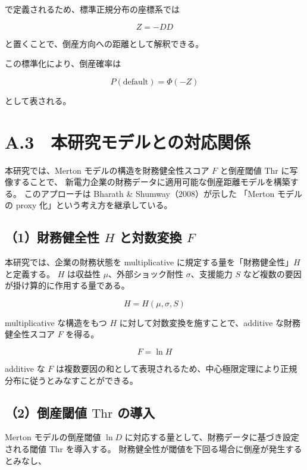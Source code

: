 で定義されるため、標準正規分布の座標系では



\[
Z = -DD
\]



と置くことで、倒産方向への距離として解釈できる。

この標準化により、倒産確率は



\[
P(\text{default}) = \Phi(-Z)
\]



として表される。

\section*{A.3　本研究モデルとの対応関係}

本研究では、Merton モデルの構造を財務健全性スコア $F$ と倒産閾値 $\mathrm{Thr}$ に写像することで、
新電力企業の財務データに適用可能な倒産距離モデルを構築する。
このアプローチは Bharath \& Shumway（2008）が示した
「Merton モデルの proxy 化」という考え方を継承している。

\subsection*{（1）財務健全性 $H$ と対数変換 $F$}

本研究では、企業の財務状態を multiplicative に規定する量を「財務健全性」$H$ と定義する。
$H$ は収益性 $\mu$、外部ショック耐性 $\sigma$、支援能力 $S$ など複数の要因が掛け算的に作用する量である。



\[
H = H(\mu, \sigma, S)
\]



multiplicative な構造をもつ $H$ に対して対数変換を施すことで、additive な財務健全性スコア $F$ を得る。



\[
F = \ln H
\]



additive な $F$ は複数要因の和として表現されるため、中心極限定理により正規分布に従うとみなすことができる。

\subsection*{（2）倒産閾値 $\mathrm{Thr}$ の導入}

Merton モデルの倒産閾値 $\ln D$ に対応する量として、財務データに基づき設定される閾値 $\mathrm{Thr}$ を導入する。
財務健全性が閾値を下回る場合に倒産が発生するとみなし、



